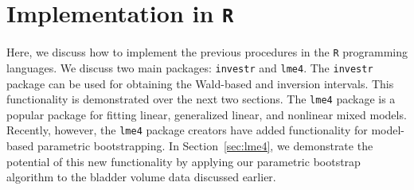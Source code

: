 \documentclass{article}\usepackage[]{graphicx}\usepackage[]{color}
\begin{document}
% 


\section[Implementation in R]{Implementation in \texttt{R}}
\label{sec:implementation}

Here, we discuss how to implement the previous procedures in the \texttt{R} programming languages.  We discuss two main packages: \texttt{investr} and \texttt{lme4}.  The \texttt{investr} package can be used for obtaining the Wald-based and inversion intervals.  This functionality is demonstrated over the next two sections.  The \texttt{lme4} package is a popular package for fitting linear, generalized linear, and nonlinear mixed models. Recently, however, the \texttt{lme4} package creators have added functionality for model-based parametric bootstrapping.  In Section~\ref{sec:lme4}, we demonstrate the potential of this new functionality by applying our parametric bootstrap algorithm to the bladder volume data discussed earlier.
\end{document}
